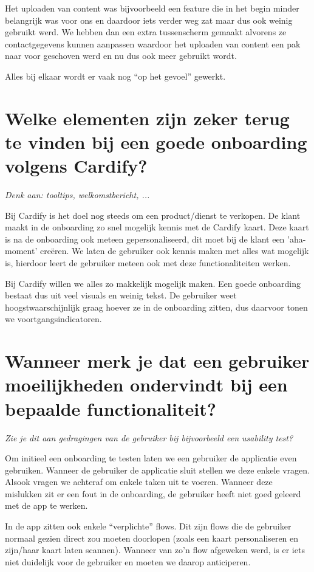 Het uploaden van content was bijvoorbeeld een feature die in het begin minder belangrijk was voor ons en daardoor iets verder weg zat maar dus ook weinig gebruikt werd. We hebben dan een extra tussenscherm gemaakt alvorens ze contactgegevens kunnen aanpassen waardoor het uploaden van content een pak naar voor geschoven werd en nu dus ook meer gebruikt wordt.

Alles bij elkaar wordt er vaak nog ``op het gevoel'' gewerkt.

\section[Vraag 3]{Welke elementen zijn zeker terug te vinden bij een goede onboarding volgens Cardify?}

\textit{Denk aan: tooltips, welkomstbericht, ...}

Bij Cardify is het doel nog steeds om een product/dienst te verkopen. De klant maakt in de onboarding zo snel mogelijk kennis met de Cardify kaart. Deze kaart is na de onboarding ook meteen gepersonaliseerd, dit moet bij de klant een 'aha-moment' creëren. We laten de gebruiker ook kennis maken met alles wat mogelijk is, hierdoor leert de gebruiker meteen ook met deze functionaliteiten werken.

Bij Cardify willen we alles zo makkelijk mogelijk maken. Een goede onboarding bestaat dus uit veel visuals en weinig tekst. De gebruiker weet hoogstwaarschijnlijk graag hoever ze in de onboarding zitten, dus daarvoor tonen we voortgangsindicatoren.

\section[Vraag 4]{Wanneer merk je dat een gebruiker moeilijkheden ondervindt bij een bepaalde functionaliteit?}

\textit{Zie je dit aan gedragingen van de gebruiker bij bijvoorbeeld een usability test?}

Om initieel een onboarding te testen laten we een gebruiker de applicatie even gebruiken. Wanneer de gebruiker de applicatie sluit stellen we deze enkele vragen. Alsook vragen we achteraf om enkele taken uit te voeren. Wanneer deze mislukken zit er een fout in de onboarding, de gebruiker heeft niet goed geleerd met de app te werken.

In de app zitten ook enkele ``verplichte'' flows. Dit zijn flows die de gebruiker normaal gezien direct zou moeten doorlopen (zoals een kaart personaliseren en zijn/haar kaart laten scannen). Wanneer van zo'n flow afgeweken werd, is er iets niet duidelijk voor de gebruiker en moeten we daarop anticiperen.

